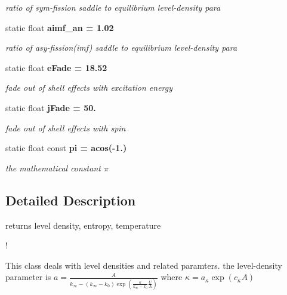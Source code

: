 \begin{CompactItemize}
\begin{CompactList}\small\item\em ratio of sym-fission saddle to equilibrium level-density para \item\end{CompactList}\item 
static float \bf{aimf\_\-an} = 1.02\label{classCLevelDensity_18087f4cc08ed484bc2be0757dd56bf5}

\begin{CompactList}\small\item\em ratio of asy-fission(imf) saddle to equilibrium level-density para \item\end{CompactList}\item 
static float \bf{e\-Fade} = 18.52\label{classCLevelDensity_cc813690a415d62c977ee7d6d9125f90}

\begin{CompactList}\small\item\em fade out of shell effects with excitation energy \item\end{CompactList}\item 
static float \bf{j\-Fade} = 50.\label{classCLevelDensity_9b2cb43c005e88d8fbedd5853e9960e5}

\begin{CompactList}\small\item\em fade out of shell effects with spin \item\end{CompactList}\item 
static float const \bf{pi} = acos(-1.)\label{classCLevelDensity_2a8c4bc82f1676360d9a68e33ab82067}

\begin{CompactList}\small\item\em the mathematical constant $\pi$ \item\end{CompactList}\end{CompactItemize}


\subsection{Detailed Description}
returns level density, entropy, temperature 

!

This class deals with level densities and related paramters. the level-density parameter is $a=\frac{A}{k_{\infty} - \left(k_{\infty} -k_{0} \right) \exp\left( \frac{\kappa}{k_{\infty}-k_{0}}\frac{U}{A}\right)}$ where $ \kappa = a_{\kappa} \exp\left(c_{\kappa} A\right) $ 



